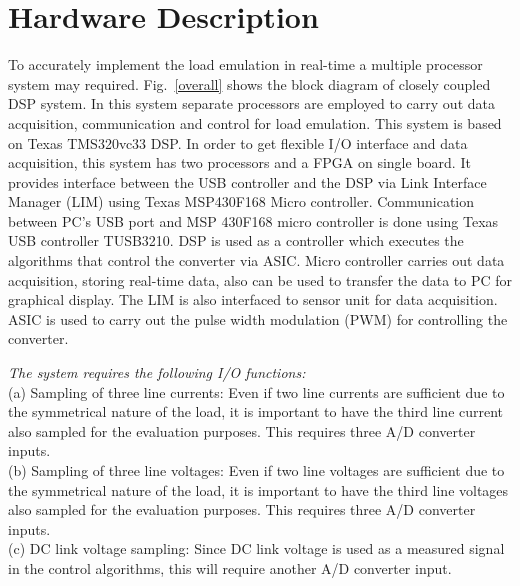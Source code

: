 \chapter{Hardware Description}
To accurately implement the  load emulation in real-time a multiple processor
system may required. Fig.~\ref{overall} shows the block diagram of closely coupled DSP system. In this system separate processors are employed to carry out data acquisition, communication and control for load emulation. This system is based on Texas TMS320vc33 DSP. In order to get flexible I/O interface and data acquisition, this system has two processors and a FPGA on single board. It provides interface between the USB controller and the DSP via Link Interface Manager (LIM) using Texas MSP430F168 Micro controller. Communication between PC's USB port and MSP 430F168 micro controller is done using Texas USB controller TUSB3210. DSP is used as a controller which executes the algorithms that control the converter via ASIC. Micro controller carries out data acquisition, storing real-time data, also  can  be used to transfer the data to PC for graphical display. The LIM is also interfaced to sensor unit for data acquisition.
ASIC is used to carry out the pulse width modulation (PWM) for controlling  the converter.\par

\emph {The system requires the following I/O functions:}\\
(a) Sampling of three line currents: Even if two line currents are sufficient due to the symmetrical nature of the load, it is important to have the third line current also sampled for the evaluation purposes. This requires three A/D converter inputs.\\
(b) Sampling of three line voltages: Even if two line voltages are sufficient due to the symmetrical nature of the load, it is important to have the third line voltages also sampled for the evaluation purposes. This requires three A/D converter inputs.\\
(c) DC link voltage sampling: Since DC link voltage is used as a measured signal in the control algorithms, this will require another A/D converter input.
